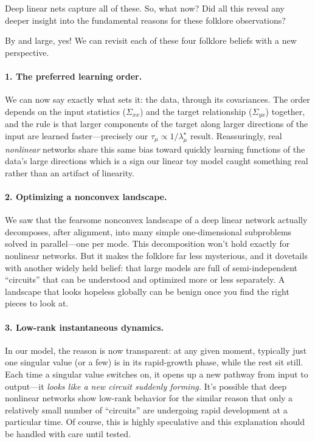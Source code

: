 Deep linear nets capture all of these. So, what now? Did all this reveal any deeper insight into the fundamental reasons for these folklore observations?

By and large, yes! We can revisit each of these four folklore beliefs with a new perspective.

\paragraph{1. The preferred learning order.} We can now say exactly what sets it:
the data, through its covariances. The order depends on the input statistics
($\Sigma_{xx}$) and the target relationship ($\Sigma_{yx}$) together, and the rule
is that larger components of the target along larger directions of the input are
learned faster---precisely our $\tau_\mu \propto 1/\lambda^\star_\mu$ result.
Reassuringly, real \emph{nonlinear} networks share this same bias toward quickly
learning functions of the data's large directions which
is a sign our linear toy model caught something real rather than an artifact of
linearity.

\paragraph{2. Optimizing a nonconvex landscape.} We saw that the fearsome
nonconvex landscape of a deep linear network actually decomposes, after alignment,
into many simple one-dimensional subproblems solved in parallel---one per mode.
This decomposition won't hold exactly for nonlinear networks. But it makes the
folklore far less mysterious, and it dovetails with another widely held belief:
that large models are full of semi-independent ``circuits'' that can be understood
and optimized more or less separately. A landscape that looks hopeless globally
can be benign once you find the right pieces to look at.

\paragraph{3. Low-rank instantaneous dynamics.} In our model, the reason is now
transparent: at any given moment, typically just one singular value (or a few) is
in its rapid-growth phase, while the rest sit still. Each time a singular value
switches on, it opens up a new pathway from input to output---it \emph{looks like
a new circuit suddenly forming.} It’s possible that deep nonlinear networks show low-rank behavior for the similar reason that only a relatively small number of “circuits” are undergoing rapid development at a particular time. Of course, this is highly speculative and this explanation should be handled with care until tested.

